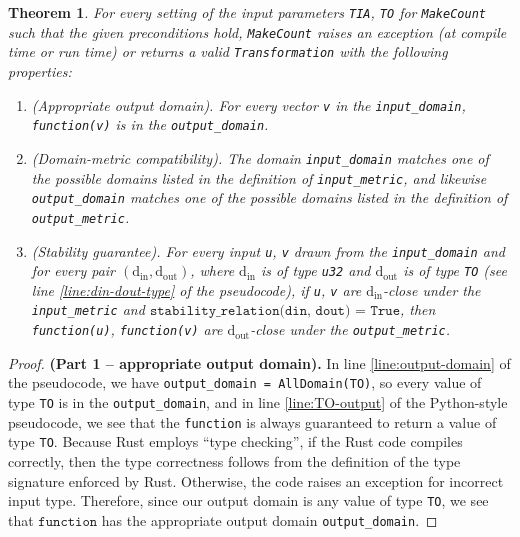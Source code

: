 \documentclass[11pt,letterpaper]{article}
\newcommand{\din}{\mathrm{d_{in}}}
\newcommand{\dout}{\mathrm{d_{out}}}
\newcommand{\function}{\texttt{function}}
\newtheorem{theorem}{Theorem}[section]
\theoremstyle{definition}
\begin{document}
\begin{theorem}
\label{thrm:domain-and-stability}
    For every setting of the input parameters \texttt{TIA}, \texttt{TO} for \texttt{MakeCount} such that the given preconditions hold, \texttt{MakeCount} raises an exception (at compile time or run time) or returns a valid \texttt{Transformation} with the following properties:
    \begin{enumerate}
        \item \textup{(Appropriate output domain).} For every vector \texttt{v} in the \texttt{input\_domain}, \texttt{function(v)} is in the \texttt{output\_domain}.
        
        \item \textup{(Domain-metric compatibility).} The domain \texttt{input\_domain} matches one of the possible domains listed in the definition of \texttt{input\_metric}, and likewise \texttt{output\_domain} matches one of the possible domains listed in the definition of \texttt{output\_metric}.
        
        \item \textup{(Stability guarantee).} For every input \texttt{u}, \texttt{v} drawn from the \texttt{input\_domain} and for every pair $(\din, \dout)$, where $\din$ is of type \texttt{u32} and $\dout$ is of type \texttt{TO} (see line \ref{line:din-dout-type} of the pseudocode), if \texttt{u}, \texttt{v} are $\din$-close under the \texttt{input\_metric} and $\texttt{stability\_relation(din, dout) = True}$, then \texttt{function(u)}, \texttt{function(v)} are $\dout$-close under the \texttt{output\_metric}.
    \end{enumerate}
\end{theorem}

\begin{proof} \textbf{(Part 1 -- appropriate output domain).}
In line \ref{line:output-domain} of the pseudocode, we have \texttt{output\_domain = AllDomain(TO)}, so every value of type \texttt{TO} is in the \texttt{output\_domain}, and in line \ref{line:TO-output} of the Python-style pseudocode, we see that the \texttt{function} is always guaranteed to return a value of type \texttt{TO}. Because Rust employs ``type checking'',
if the Rust code compiles correctly, then the type correctness follows from the definition of the type signature enforced by Rust. Otherwise, the code raises an exception for incorrect input type.
Therefore, since our output domain is any value of type \texttt{TO}, we see that $\function$ has the appropriate output domain \texttt{output\_domain}.

\end{proof}
\end{document}

